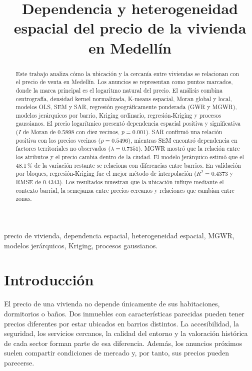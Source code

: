 \documentclass[conference]{IEEEtran}
\title{Dependencia y heterogeneidad espacial del precio de la vivienda en Medellín}
\author{
\IEEEauthorblockN{Kevin Arley Parra Henao}
\IEEEauthorblockA{
Universidad Nacional de Colombia, sede Medellín\\
Curso de Análisis Geoespacial
}
}
\begin{document}
\maketitle

\begin{abstract}
Este trabajo analiza cómo la ubicación y la cercanía entre viviendas se relacionan con el precio de venta en Medellín. Los anuncios se representan como puntos marcados, donde la marca principal es el logaritmo natural del precio. El análisis combina centrografía, densidad kernel normalizada, K-means espacial, Moran global y local, modelos OLS, SEM y SAR, regresión geográficamente ponderada (GWR y MGWR), modelos jerárquicos por barrio, Kriging ordinario, regresión-Kriging y procesos gaussianos. El precio logarítmico presentó dependencia espacial positiva y significativa ($I$ de Moran de 0.5898 con diez vecinos, $p=0.001$). SAR confirmó una relación positiva con los precios vecinos ($\rho=0.5496$), mientras SEM encontró dependencia en factores territoriales no observados ($\lambda=0.7351$). MGWR mostró que la relación entre los atributos y el precio cambia dentro de la ciudad. El modelo jerárquico estimó que el 48.1\,\% de la variación restante se relaciona con diferencias entre barrios. En validación por bloques, regresión-Kriging fue el mejor método de interpolación ($R^2=0.4373$ y RMSE de 0.4343). Los resultados muestran que la ubicación influye mediante el contexto barrial, la semejanza entre precios cercanos y relaciones que cambian entre zonas.
\end{abstract}

\begin{IEEEkeywords}
precio de vivienda, dependencia espacial, heterogeneidad espacial, MGWR, modelos jerárquicos, Kriging, procesos gaussianos.
\end{IEEEkeywords}

\section{Introducción}

El precio de una vivienda no depende únicamente de sus habitaciones, dormitorios o baños. Dos inmuebles con características parecidas pueden tener precios diferentes por estar ubicados en barrios distintos. La accesibilidad, la seguridad, los servicios cercanos, la calidad del entorno y la valoración histórica de cada sector forman parte de esa diferencia. Además, los anuncios próximos suelen compartir condiciones de mercado y, por tanto, sus precios pueden parecerse.
\end{document}

